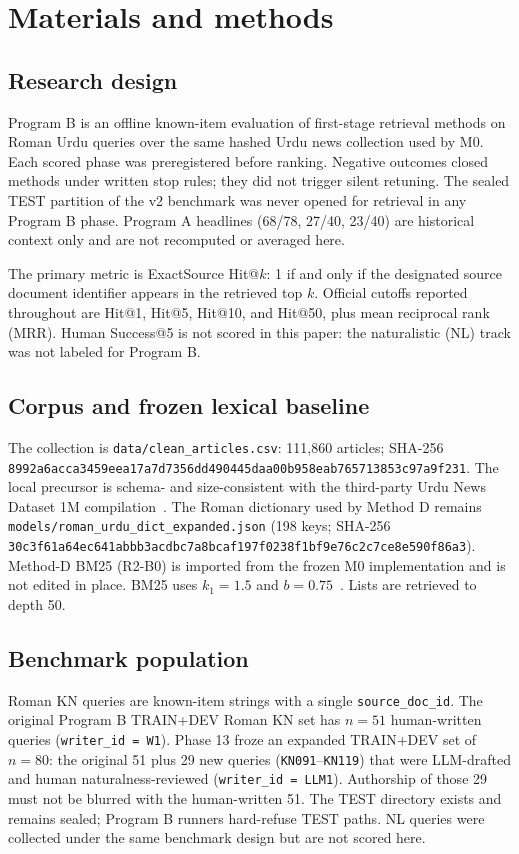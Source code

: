 \documentclass[10pt,letterpaper]{article}
\begin{document}
\section*{Materials and methods}
\subsection*{Research design}

Program B is an offline known-item evaluation of first-stage retrieval methods on Roman Urdu queries over the same hashed Urdu news collection used by M0. Each scored phase was preregistered before ranking. Negative outcomes closed methods under written stop rules; they did not trigger silent retuning. The sealed TEST partition of the v2 benchmark was never opened for retrieval in any Program B phase. Program A headlines (68/78, 27/40, 23/40) are historical context only and are not recomputed or averaged here.

The primary metric is ExactSource Hit@$k$: 1 if and only if the designated source document identifier appears in the retrieved top $k$. Official cutoffs reported throughout are Hit@1, Hit@5, Hit@10, and Hit@50, plus mean reciprocal rank (MRR). Human Success@5 is not scored in this paper: the naturalistic (NL) track was not labeled for Program B.

\subsection*{Corpus and frozen lexical baseline}

The collection is \texttt{data/clean\_articles.csv}: 111,860 articles; SHA-256 \texttt{8992a6acca3459eea17a7d7356dd490445daa00b958eab765713853c97a9f231}. The local precursor is schema- and size-consistent with the third-party Urdu News Dataset 1M compilation~\cite{bib16,bib17}. The Roman dictionary used by Method D remains \texttt{models/roman\_urdu\_dict\_expanded.json} (198 keys; SHA-256 \texttt{30c3f61a64ec641abbb3acdbc7a8bcaf197f0238f1bf9e76c2c7ce8e590f86a3}). Method-D BM25 (R2-B0) is imported from the frozen M0 implementation and is not edited in place. BM25 uses $k_1 = 1.5$ and $b = 0.75$~\cite{bib13}. Lists are retrieved to depth 50.

\subsection*{Benchmark population}

Roman KN queries are known-item strings with a single \texttt{source\_doc\_id}. The original Program B TRAIN+DEV Roman KN set has $n = 51$ human-written queries (\texttt{writer\_id = W1}). Phase 13 froze an expanded TRAIN+DEV set of $n = 80$: the original 51 plus 29 new queries (\texttt{KN091}--\texttt{KN119}) that were LLM-drafted and human naturalness-reviewed (\texttt{writer\_id = LLM1}). Authorship of those 29 must not be blurred with the human-written 51. The TEST directory exists and remains sealed; Program B runners hard-refuse TEST paths. NL queries were collected under the same benchmark design but are not scored here.
\end{document}
